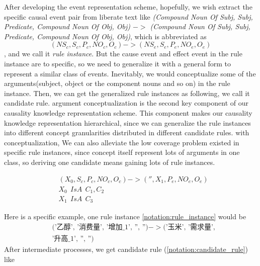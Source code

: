 After developing the event representation scheme, hopefully, we wish extract the specific causal event pair from liberate text like \textit{(Compound Noun Of Subj, Subj, Predicate, Compound Noun Of Obj, Obj) $->$ (Compound Noun Of Subj, Subj, Predicate, Compound Noun Of Obj, Obj)}, which is abbreviated as
\begin{equation} 
(NS_c, S_c, P_c, NO_c, O_c)->(NS_e, S_e, P_e, NO_e, O_e)
\label{notation:rule_instance}
\end{equation}
, and we call it \textit{rule instance}. But the cause event and effect event in the rule instance are to specific, so we need to generalize it with a general form to represent a similar class of events. Inevitably, we would conceptualize some of the arguments(subject, object or the component nouns and so on) in the rule instance. Then, we can get the generalized rule instances as following, we call it candidate rule. argument conceptualization is the second key component of our causality knowledge representation scheme. This component makes our causality knowledge representation hierarchical, since we can generalize the rule instances into different concept granularities distributed in different candidate rules. with conceptualization, We can also alleviate the low coverage problem existed in specific rule instances, since concept itself represent lots of arguments in one class, so deriving one candidate means gaining lots of rule instances.  

\begin{equation}
\begin{split}
&(X_0, S_c, P_c, NO_c, O_c)->('', X_1, P_e, NO_e, O_e)\\
&X_0 \ \ IsA \ \ C_1, C_2\\
&X_1 \ \ IsA \ \ C_3
\end{split}
\label{notation:candidate_rule}
\end{equation}

Here is a specific example, one rule instance \ref{notation:rule_instance} would be 
\begin{equation} 
\begin{split}
&\text{('乙醇', '消费量', '增加\_1', '', '')} -> \text{('玉米', '需求量',}\\
& \text{'升高\_1', '', '')}
\end{split}
\label{notation:rule_instance_example}
\end{equation}
After intermediate processes, we get candidate rule (\ref{notation:candidate_rule}) like

